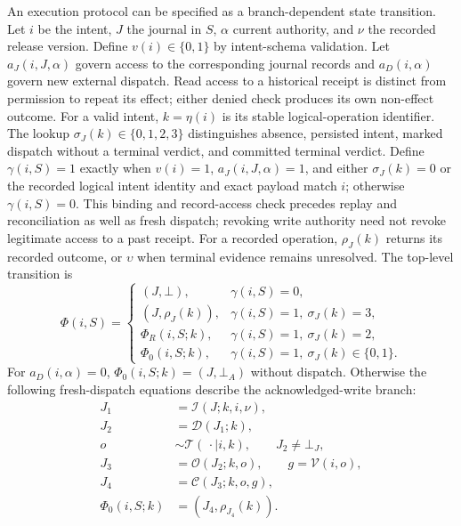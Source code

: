 An execution protocol can be specified as a branch-dependent state transition. Let $i$ be the intent, $J$ the journal in $S$, $\alpha$ current authority, and $\nu$ the recorded release version. Define $v(i)\in\{0,1\}$ by intent-schema validation. Let $a_J(i,J,\alpha)$ govern access to the corresponding journal records and $a_D(i,\alpha)$ govern new external dispatch. Read access to a historical receipt is distinct from permission to repeat its effect; either denied check produces its own non-effect outcome. For a valid intent, $k=\eta(i)$ is its stable logical-operation identifier. The lookup $\sigma_J(k)\in\{0,1,2,3\}$ distinguishes absence, persisted intent, marked dispatch without a terminal verdict, and committed terminal verdict. Define $\gamma(i,S)=1$ exactly when $v(i)=1$, $a_J(i,J,\alpha)=1$, and either $\sigma_J(k)=0$ or the recorded logical intent identity and exact payload match $i$; otherwise $\gamma(i,S)=0$. This binding and record-access check precedes replay and reconciliation as well as fresh dispatch; revoking write authority need not revoke legitimate access to a past receipt. For a recorded operation, $\rho_J(k)$ returns its recorded outcome, or $\upsilon$ when terminal evidence remains unresolved. The top-level transition is
\begin{equation}
 \Phi(i,S)=
 \begin{cases}
  (J,\bot),&\gamma(i,S)=0,\\
  (J,\rho_J(k)),&\gamma(i,S)=1,\ \sigma_J(k)=3,\\
  \Phi_R(i,S;k),&\gamma(i,S)=1,\ \sigma_J(k)=2,\\
  \Phi_0(i,S;k),&\gamma(i,S)=1,\ \sigma_J(k)\in\{0,1\}.
 \end{cases}
\label{eq:C20:execution_branches}
\end{equation}
For $a_D(i,\alpha)=0$, $\Phi_0(i,S;k)=(J,\bot_A)$ without dispatch. Otherwise the following fresh-dispatch equations describe the acknowledged-write branch:
\begin{equation}
\begin{aligned}
 J_1&=\mathcal I(J;k,i,\nu),\\
 J_2&=\mathcal D(J_1;k),\\
 o&\sim\mathcal T(\,\cdot\mid i,k),\qquad J_2\ne\bot_J,\\
 J_3&=\mathcal O(J_2;k,o),\qquad g=\mathcal V(i,o),\\
 J_4&=\mathcal C(J_3;k,o,g),\\
 \Phi_0(i,S;k)&=(J_4,\rho_{J_4}(k)).
\end{aligned}
\label{eq:C20:fresh_dispatch_transition}
\end{equation}
